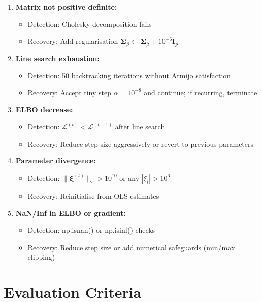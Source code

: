 \documentclass[11pt,a4paper]{article}
\begin{document}
\begin{enumerate}
\item \textbf{Matrix not positive definite:}
\begin{itemize}
\item Detection: Cholesky decomposition fails
\item Recovery: Add regularisation $\bm{\Sigma}_\beta \leftarrow \bm{\Sigma}_\beta + 10^{-6} \bm{I}_p$
\end{itemize}

\item \textbf{Line search exhaustion:}
\begin{itemize}
\item Detection: 50 backtracking iterations without Armijo satisfaction
\item Recovery: Accept tiny step $\alpha = 10^{-8}$ and continue; if recurring, terminate
\end{itemize}

\item \textbf{ELBO decrease:}
\begin{itemize}
\item Detection: $\mathcal{L}^{(t)} < \mathcal{L}^{(t-1)}$ after line search
\item Recovery: Reduce step size aggressively or revert to previous parameters
\end{itemize}

\item \textbf{Parameter divergence:}
\begin{itemize}
\item Detection: $\|\bm{\xi}^{(t)}\|_2 > 10^{10}$ or any $|\xi_i| > 10^{6}$
\item Recovery: Reinitialise from OLS estimates
\end{itemize}

\item \textbf{NaN/Inf in ELBO or gradient:}
\begin{itemize}
\item Detection: np.isnan() or np.isinf() checks
\item Recovery: Reduce step size or add numerical safeguards (min/max clipping)
\end{itemize}
\end{enumerate}

\newpage
\section*{Evaluation Criteria}
\end{document}
